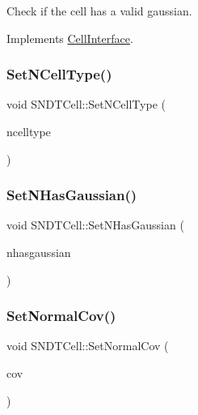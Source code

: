 Check if the cell has a valid gaussian. 



Implements \hyperlink{classCellInterface_a4fde95ddb0950dc41ee77dfdeb90928b}{Cell\+Interface}.

\mbox{\label{classSNDTCell_a826cb5085a4f419ccb9b39e6a45590bf}} 
\subsubsection{\texorpdfstring{Set\+N\+Cell\+Type()}{SetNCellType()}}
{\footnotesize\ttfamily void S\+N\+D\+T\+Cell\+::\+Set\+N\+Cell\+Type (\begin{DoxyParamCaption}\item[{\hyperlink{classSNDTCell_a89f320f167cfeb7ccdbb4a578a169341}{Cell\+Type}}]{ncelltype }\end{DoxyParamCaption})\hspace{0.3cm}{\ttfamily [inline]}}

\mbox{\label{classSNDTCell_a5a6be9eb1c086f893f9cf8f5996a9246}} 
\subsubsection{\texorpdfstring{Set\+N\+Has\+Gaussian()}{SetNHasGaussian()}}
{\footnotesize\ttfamily void S\+N\+D\+T\+Cell\+::\+Set\+N\+Has\+Gaussian (\begin{DoxyParamCaption}\item[{bool}]{nhasgaussian }\end{DoxyParamCaption})\hspace{0.3cm}{\ttfamily [inline]}}

\mbox{\label{classSNDTCell_ab814a0908068fa7d17821d8824b1f811}} 
\subsubsection{\texorpdfstring{Set\+Normal\+Cov()}{SetNormalCov()}}
{\footnotesize\ttfamily void S\+N\+D\+T\+Cell\+::\+Set\+Normal\+Cov (\begin{DoxyParamCaption}\item[{const Eigen\+::\+Matrix2d \&}]{cov }\end{DoxyParamCaption})\hspace{0.3cm}{\ttfamily [inline]}}

